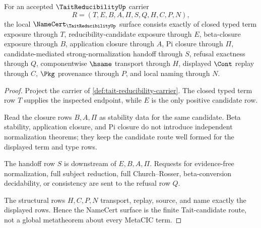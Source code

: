 \begin{theorem}
\label{thm:tait-reducibility-namecert-obligations}
For an accepted $\TaitReducibilityUp$ carrier
$$
R=(T,E,B,A,\Pi,S,Q,H,C,P,N),
$$
the local $\NameCert_{\TaitReducibilityUp}$ surface consists exactly of closed typed term exposure through $T$, reducibility-candidate exposure through $E$, beta-closure exposure through $B$, application closure through $A$, Pi closure through $\Pi$, candidate-mediated strong-normalization handoff through $S$, refusal exactness through $Q$, componentwise $\hsame$ transport through $H$, displayed $\Cont$ replay through $C$, $\Pkg$ provenance through $P$, and local naming through $N$.
\end{theorem}
\begin{proof}
Project the carrier of \autoref{def:tait-reducibility-carrier}. The closed typed term row $T$ supplies the inspected endpoint, while $E$ is the only positive candidate row.

Read the closure rows $B,A,\Pi$ as stability data for the same candidate. Beta stability, application closure, and Pi closure do not introduce independent normalization theorems; they keep the candidate route well formed for the displayed term and type rows.

The handoff row $S$ is downstream of $E,B,A,\Pi$. Requests for evidence-free normalization, full subject reduction, full Church--Rosser, beta-conversion decidability, or consistency are sent to the refusal row $Q$.

The structural rows $H,C,P,N$ transport, replay, source, and name exactly the displayed rows. Hence the NameCert surface is the finite Tait-candidate route, not a global metatheorem about every MetaCIC term.
\end{proof}

